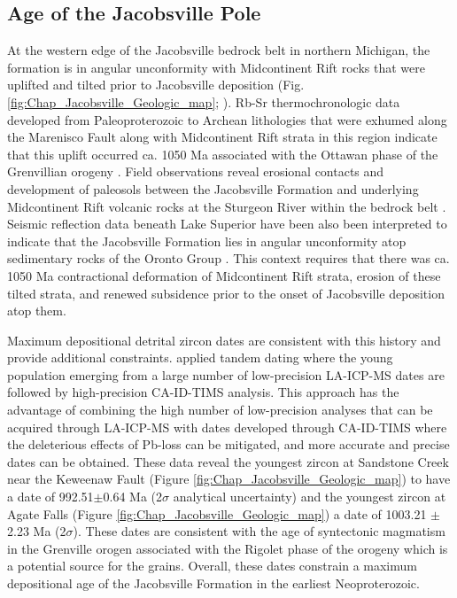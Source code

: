 \subsection*{Age of the Jacobsville Pole}

At the western edge of the Jacobsville bedrock belt in northern Michigan, the formation is in angular unconformity with Midcontinent Rift rocks that were uplifted and tilted prior to Jacobsville deposition (Fig. \ref{fig:Chap_Jacobsville_Geologic_map}; \cite{Hedgman1992a, Cannon1995a}). Rb-Sr thermochronologic data developed from Paleoproterozoic to Archean lithologies that were exhumed along the Marenisco Fault along with Midcontinent Rift strata in this region indicate that this uplift occurred ca. 1050 Ma associated with the Ottawan phase of the Grenvillian orogeny \cite{Cannon1993a}. Field observations reveal erosional contacts and development of paleosols between the Jacobsville Formation and underlying Midcontinent Rift volcanic rocks at the Sturgeon River within the bedrock belt \citep{Hamblin1958a, Zbinden1988a}. Seismic reflection data beneath Lake Superior have been also been interpreted to indicate that the Jacobsville Formation lies in angular unconformity atop sedimentary rocks of the Oronto Group \citep{Cannon1989a}. This context requires that there was ca. 1050 Ma contractional deformation of Midcontinent Rift strata, erosion of these tilted strata, and renewed subsidence prior to the onset of Jacobsville deposition atop them.

Maximum depositional detrital zircon dates are consistent with this history and provide additional constraints. \cite{Hodgin2022a} applied tandem dating where the young population emerging from a large number of low-precision LA-ICP-MS dates are followed by high-precision CA-ID-TIMS analysis. This approach has the advantage of combining the high number of low-precision analyses that can be acquired through LA-ICP-MS with dates developed through CA-ID-TIMS where the deleterious effects of Pb-loss can be mitigated, and more accurate and precise dates can be obtained. These data reveal the youngest zircon at Sandstone Creek near the Keweenaw Fault (Figure \ref{fig:Chap_Jacobsville_Geologic_map}) to have a date of 992.51$\pm$0.64 Ma (2$\sigma$ analytical uncertainty) and the youngest zircon at Agate Falls (Figure \ref{fig:Chap_Jacobsville_Geologic_map}) a date of 1003.21 $\pm$ 2.23 Ma (2$\sigma$). These dates are consistent with the age of syntectonic magmatism in the Grenville orogen associated with the Rigolet phase of the orogeny \cite[e.g.][]{Bussy1995a, Turlin2019a, Jannin2018a} which is a potential source for the grains. Overall, these dates constrain a maximum depositional age of the Jacobsville Formation in the earliest Neoproterozoic. 

